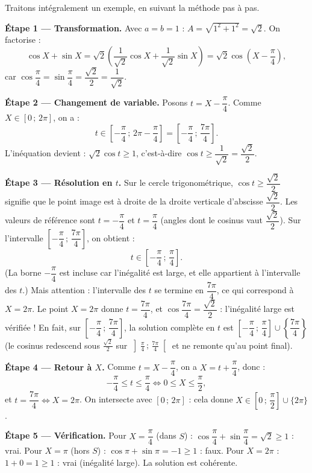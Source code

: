 \documentclass[11pt]{article}
\newcounter{popsec}
\newcounter{popsub}
\newcommand{\courssub}[1]{%
  \stepcounter{popsub}%
  \par\vspace{9pt}\noindent{\popxbold\fontsize{11.5}{13}\selectfont\color{popink}{\color{poporange}\thepopsec.\thepopsub}\hspace{6pt}#1}\par\nopagebreak\vspace{4pt}
}
\begin{document}
\courssub{Exemple complet : $\cos X + \sin X \geq 1$ dans $[0\,;\,2\pi]$}

Traitons intégralement un exemple, en suivant la méthode pas à pas.

\textbf{Étape 1 — Transformation.} Avec $a = b = 1$ : $A = \sqrt{1^2+1^2} = \sqrt{2}$. On factorise :
\[
\cos X + \sin X = \sqrt{2}\left(\frac{1}{\sqrt{2}}\cos X + \frac{1}{\sqrt{2}}\sin X\right) = \sqrt{2}\cos\left(X - \frac{\pi}{4}\right),
\]
car $\cos\dfrac{\pi}{4} = \sin\dfrac{\pi}{4} = \dfrac{\sqrt{2}}{2} = \dfrac{1}{\sqrt{2}}$.

\textbf{Étape 2 — Changement de variable.} Posons $t = X - \dfrac{\pi}{4}$. Comme $X \in [0\,;\,2\pi]$, on a :
\[
t \in \left[-\frac{\pi}{4}\,;\,2\pi - \frac{\pi}{4}\right] = \left[-\frac{\pi}{4}\,;\,\frac{7\pi}{4}\right].
\]
L'inéquation devient : $\sqrt{2}\cos t \geq 1$, c'est-à-dire $\cos t \geq \dfrac{1}{\sqrt{2}} = \dfrac{\sqrt{2}}{2}$.

\textbf{Étape 3 — Résolution en $t$.} Sur le cercle trigonométrique, $\cos t \geq \dfrac{\sqrt{2}}{2}$ signifie que le point image est à droite de la droite verticale d'abscisse $\dfrac{\sqrt{2}}{2}$. Les valeurs de référence sont $t = -\dfrac{\pi}{4}$ et $t = \dfrac{\pi}{4}$ (angles dont le cosinus vaut $\dfrac{\sqrt{2}}{2}$). Sur l'intervalle $\left[-\dfrac{\pi}{4}\,;\,\dfrac{7\pi}{4}\right]$, on obtient :
\[
t \in \left[-\frac{\pi}{4}\,;\,\frac{\pi}{4}\right].
\]
(La borne $-\dfrac{\pi}{4}$ est incluse car l'inégalité est large, et elle appartient à l'intervalle des $t$.)
Mais attention : l'intervalle des $t$ se termine en $\dfrac{7\pi}{4}$, ce qui correspond à $X = 2\pi$. Le point $X = 2\pi$ donne $t = \dfrac{7\pi}{4}$, et $\cos\dfrac{7\pi}{4} = \dfrac{\sqrt{2}}{2}$ : l'inégalité large est vérifiée ! En fait, sur $\left[-\dfrac{\pi}{4}\,;\,\dfrac{7\pi}{4}\right]$, la solution complète en $t$ est $\left[-\dfrac{\pi}{4}\,;\,\dfrac{\pi}{4}\right] \cup \left\{\dfrac{7\pi}{4}\right\}$ (le cosinus redescend sous $\frac{\sqrt2}{2}$ sur $\left]\frac{\pi}{4}\,;\,\frac{7\pi}{4}\right[$ et ne remonte qu'au point final).

\textbf{Étape 4 — Retour à $X$.} Comme $t = X - \dfrac{\pi}{4}$, on a $X = t + \dfrac{\pi}{4}$, donc :
\[
-\frac{\pi}{4} \leq t \leq \frac{\pi}{4} \iff 0 \leq X \leq \frac{\pi}{2},
\]
et $t = \dfrac{7\pi}{4} \iff X = 2\pi$.
On intersecte avec $[0\,;\,2\pi]$ : cela donne $X \in \left[0\,;\,\dfrac{\pi}{2}\right] \cup \{2\pi\}$.

\textbf{Étape 5 — Vérification.} Pour $X = \dfrac{\pi}{4}$ (dans $S$) : $\cos\dfrac{\pi}{4} + \sin\dfrac{\pi}{4} = \sqrt{2} \geq 1$ : vrai. Pour $X = \pi$ (hors $S$) : $\cos\pi + \sin\pi = -1 \geq 1$ : faux. Pour $X = 2\pi$ : $1 + 0 = 1 \geq 1$ : vrai (inégalité large). La solution est cohérente.
\end{document}
